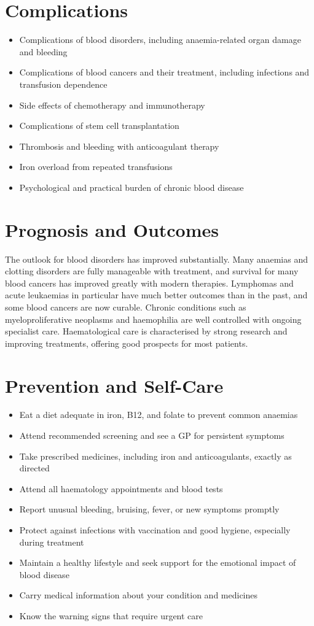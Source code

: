 \section*{Complications}
\begin{itemize}
    \item Complications of blood disorders, including anaemia-related organ damage and bleeding
    \item Complications of blood cancers and their treatment, including infections and transfusion dependence
    \item Side effects of chemotherapy and immunotherapy
    \item Complications of stem cell transplantation
    \item Thrombosis and bleeding with anticoagulant therapy
    \item Iron overload from repeated transfusions
    \item Psychological and practical burden of chronic blood disease
\end{itemize}

\section*{Prognosis and Outcomes}
The outlook for blood disorders has improved substantially. Many anaemias and clotting disorders are fully manageable with treatment, and survival for many blood cancers has improved greatly with modern therapies. Lymphomas and acute leukaemias in particular have much better outcomes than in the past, and some blood cancers are now curable. Chronic conditions such as myeloproliferative neoplasms and haemophilia are well controlled with ongoing specialist care. Haematological care is characterised by strong research and improving treatments, offering good prospects for most patients.

\section*{Prevention and Self-Care}
\begin{itemize}
    \item Eat a diet adequate in iron, B12, and folate to prevent common anaemias
    \item Attend recommended screening and see a GP for persistent symptoms
    \item Take prescribed medicines, including iron and anticoagulants, exactly as directed
    \item Attend all haematology appointments and blood tests
    \item Report unusual bleeding, bruising, fever, or new symptoms promptly
    \item Protect against infections with vaccination and good hygiene, especially during treatment
    \item Maintain a healthy lifestyle and seek support for the emotional impact of blood disease
    \item Carry medical information about your condition and medicines
    \item Know the warning signs that require urgent care
\end{itemize}

